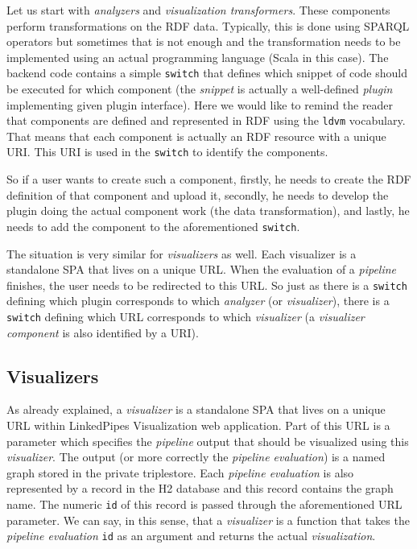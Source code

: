 Let us start with \emph{analyzers} and \emph{visualization transformers}. These components perform transformations on the RDF data. Typically, this is done using SPARQL operators but sometimes that is not enough and the transformation needs to be implemented using an actual programming language (Scala in this case). The backend code contains a simple \texttt{switch} that defines which snippet of code should be executed for which component (the \emph{snippet} is actually a well-defined \emph{plugin} implementing given plugin interface). Here we would like to remind the reader that components are defined and represented in RDF using the \texttt{ldvm} vocabulary. That means that each component is actually an RDF resource with a unique URI. This URI is used in the \texttt{switch} to identify the components. 

So if a user wants to create such a component, firstly, he needs to create the RDF definition of that component and upload it, secondly, he needs to develop the plugin doing the actual component work (the data transformation), and lastly, he needs to add the component to the aforementioned \texttt{switch}. 

The situation is very similar for \emph{visualizers} as well. Each visualizer is a standalone SPA that lives on a unique URL. When the evaluation of a \emph{pipeline} finishes, the user needs to be redirected to this URL. So just as there is a \texttt{switch} defining which plugin corresponds to which \emph{analyzer} (or \emph{visualizer}), there is a \texttt{switch} defining which URL corresponds to which \emph{visualizer} (a \emph{visualizer component} is also identified by a URI).

\subsection{Visualizers}

As already explained, a \emph{visualizer} is a standalone SPA that lives on a unique URL within LinkedPipes Visualization web application. Part of this URL is a parameter which specifies the \emph{pipeline} output that should be visualized using this \emph{visualizer}. The output (or more correctly the \emph{pipeline evaluation}) is a named graph stored in the private triplestore. Each \emph{pipeline evaluation} is also represented by a record in the H2 database and this record contains the graph name. The numeric \texttt{id} of this record is passed through the aforementioned URL parameter. We can say, in this sense, that a \emph{visualizer} is a function that takes the \emph{pipeline evaluation} \texttt{id} as an argument and returns the actual \emph{visualization}.
%
%
%

